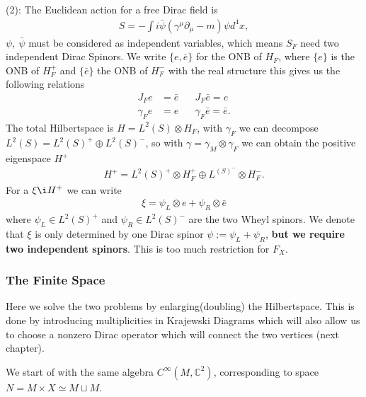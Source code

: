 (2): The Euclidean action for a free Dirac field is
\begin{align}
    S = - \int i \bar{\psi}(\gamma ^\mu\partial _\mu - m) \psi d^4x,
\end{align}
$\psi,\ \bar{\psi}$ must be considered as independent variables, which means
$S_F$ need two independent Dirac Spinors. We write $\{e, \bar{e}\}$ for the
ONB of $H_F$, where $\{e\}$ is the ONB of $H_F^+$ and $\{\bar{e}\}$ the ONB
of $H_F^-$ with the real structure this gives us the following relations
\begin{align}
    J_F e &= \bar{e} \;\;\;\;\;\; J_F \bar{e} = e \\
    \gamma_F e &= e  \;\;\;\;\;\;   \gamma_F \bar{e} = \bar{e}.
\end{align}
The total Hilbertspace is $H = L^2(S) \otimes H_F$, with $\gamma _F$ we can
decompose $L^2(S) = L^2(S)^+ \oplus L^2(S)^-$, so with $\gamma = \gamma _M
\otimes \gamma _F$ we can obtain the positive eigenspace $H^+$
\begin{align}
    H^+ = L^2(S)^+ \otimes H_F^+ \oplus L^(S)^- \otimes H_F^-.
\end{align}
For a $\xi \i H^+$ we can write
\begin{align}
    \xi = \psi _L \otimes e + \psi _R \otimes \bar{e}
\end{align}
where $\psi _L \in L^2(S)^+$ and $\psi _R \in L^2(S)^-$ are the two Wheyl
spinors. We denote that $\xi$ is only determined by one Dirac spinor $\psi :=
\psi_L + \psi _R$, \textbf{but we require two independent spinors}. This is
too much restriction for $F_X$.
\subsubsection{The Finite Space}
Here we solve the two problems by enlarging(doubling) the Hilbertspace. This
is done by introducing multiplicities in Krajewski Diagrams which will also
allow us to choose a nonzero Dirac operator which will connect the two
vertices (next chapter).
\newline

We start of with the same algebra $C^\infty(M, \mathbb{C}^2)$, corresponding
to space $N= M\times X \simeq M\sqcup M$.
\newline

